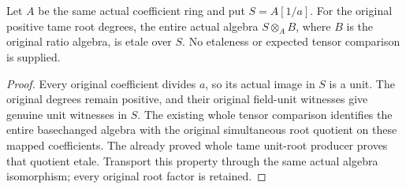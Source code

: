 \begin{theorem}
\label{thm:kn-canonical-original-ratio-localized-etale}
\leanok
Let $A$ be the same actual coefficient ring and put $S=A[1/a]$.
For the original positive tame root degrees, the entire actual algebra
$S\otimes_A B$, where $B$ is the original ratio algebra, is etale over
$S$. No etaleness or expected tensor comparison is supplied.
\end{theorem}
\begin{proof}
Every original coefficient divides $a$, so its actual image in $S$ is
a unit. The original degrees remain positive, and their original
field-unit witnesses give genuine unit witnesses in $S$. The existing
whole tensor comparison identifies the entire basechanged algebra with
the original simultaneous root quotient on these mapped coefficients.
The already proved whole tame unit-root producer proves that quotient
etale. Transport this property through the same actual algebra
isomorphism; every original root factor is retained.
\end{proof}
